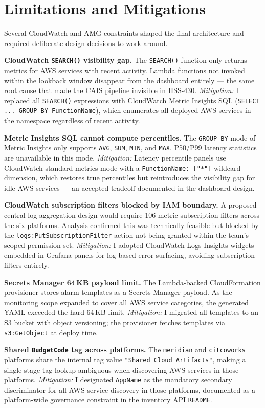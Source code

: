 \section{Limitations and Mitigations}
\label{sec:limitations}

Several CloudWatch and AMG constraints shaped the final architecture and
required deliberate design decisions to work around.

\textbf{CloudWatch \texttt{SEARCH()} visibility gap.} The \texttt{SEARCH()}
function only returns metrics for AWS services with recent activity. Lambda
functions not invoked within the lookback window disappear from the
dashboard entirely --- the same root cause that made the CAIS pipeline
invisible in IISS-430. \textit{Mitigation:} I replaced all
\texttt{SEARCH()} expressions with CloudWatch Metric Insights SQL
(\texttt{SELECT ... GROUP BY FunctionName}), which enumerates all
deployed AWS services in the namespace regardless of recent activity.

\textbf{Metric Insights SQL cannot compute percentiles.} The
\texttt{GROUP BY} mode of Metric Insights only supports \texttt{AVG},
\texttt{SUM}, \texttt{MIN}, and \texttt{MAX}. P50/P99 latency statistics
are unavailable in this mode. \textit{Mitigation:} Latency percentile
panels use CloudWatch standard metrics mode with a
\texttt{FunctionName:~["*"]} wildcard dimension, which restores true
percentiles but reintroduces the visibility gap for idle AWS services ---
an accepted tradeoff documented in the dashboard design.

\textbf{CloudWatch subscription filters blocked by IAM boundary.}
A proposed central log-aggregation design would require 106 metric
subscription filters across the six platforms. Analysis confirmed this
was technically feasible but blocked by the
\texttt{logs:PutSubscriptionFilter} action not being granted within the
team's scoped permission set. \textit{Mitigation:} I adopted CloudWatch
Logs Insights widgets embedded in Grafana panels for log-based error
surfacing, avoiding subscription filters entirely.

\textbf{Secrets Manager 64\,KB payload limit.} The Lambda-backed
CloudFormation provisioner stores alarm templates as a Secrets Manager
payload. As the monitoring scope expanded to cover all AWS service
categories, the generated YAML exceeded the hard 64\,KB limit.
\textit{Mitigation:} I migrated all templates to an S3 bucket with
object versioning; the provisioner fetches templates via
\texttt{s3:GetObject} at deploy time.

\textbf{Shared \texttt{BudgetCode} tag across platforms.} The
\texttt{meridian} and \texttt{citcoworks} platforms share the internal
tag value \texttt{"Shared Cloud Artifacts"}, making a single-stage tag
lookup ambiguous when discovering AWS services in those platforms.
\textit{Mitigation:} I designated \texttt{AppName} as the mandatory
secondary discriminator for all AWS service discovery in those platforms,
documented as a platform-wide governance constraint in the inventory API
\texttt{README}.
